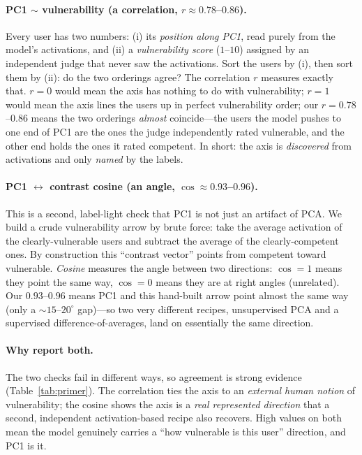 \documentclass{article}
\begin{document}
\paragraph{PC1 $\sim$ vulnerability (a correlation, $r{\approx}0.78$--$0.86$).}
Every user has two numbers: (i) its \emph{position along PC1}, read purely from the
model's activations, and (ii) a \emph{vulnerability score} ($1$--$10$) assigned by
an independent judge that never saw the activations. Sort the users by (i), then
sort them by (ii): do the two orderings agree? The correlation $r$ measures exactly
that. $r{=}0$ would mean the axis has nothing to do with vulnerability; $r{=}1$
would mean the axis lines the users up in perfect vulnerability order; our
$r{=}0.78$--$0.86$ means the two orderings \emph{almost} coincide---the users the
model pushes to one end of PC1 are the ones the judge independently rated
vulnerable, and the other end holds the ones it rated competent. In short: the axis
is \emph{discovered} from activations and only \emph{named} by the labels.

\paragraph{PC1 $\leftrightarrow$ contrast cosine (an angle,
$\cos{\approx}0.93$--$0.96$).} This is a second, label-light check that PC1 is not
just an artifact of PCA. We build a crude vulnerability arrow by brute force: take
the average activation of the clearly-vulnerable users and subtract the average of
the clearly-competent ones. By construction this ``contrast vector'' points from
competent toward vulnerable. \emph{Cosine} measures the angle between two
directions: $\cos{=}1$ means they point the same way, $\cos{=}0$ means they are at
right angles (unrelated). Our $0.93$--$0.96$ means PC1 and this hand-built arrow
point almost the same way (only a ${\sim}15$--$20^\circ$ gap)---so two very
different recipes, unsupervised PCA and a supervised difference-of-averages, land
on essentially the same direction.

\paragraph{Why report both.} The two checks fail in different ways, so agreement is
strong evidence (Table~\ref{tab:primer}). The correlation ties the axis to an
\emph{external human notion} of vulnerability; the cosine shows the axis is a
\emph{real represented direction} that a second, independent activation-based
recipe also recovers. High values on both mean the model genuinely carries a
``how vulnerable is this user'' direction, and PC1 is it.
\end{document}
